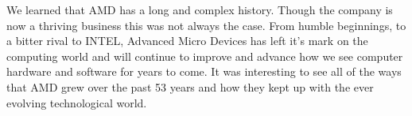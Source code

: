 \documentclass[../computer-history.tex]{subfiles}
\begin{document}
We learned that AMD has a long and complex history. Though the company is now a thriving business this was not always the case. From humble beginnings, to a bitter rival to INTEL, Advanced Micro Devices has left it's mark on the computing world and will continue to improve and advance how we see computer hardware and software for years to come. It was interesting to see all of the ways that AMD grew over the past 53 years and how they kept up with the ever evolving technological world.
\biblio
\end{document}

